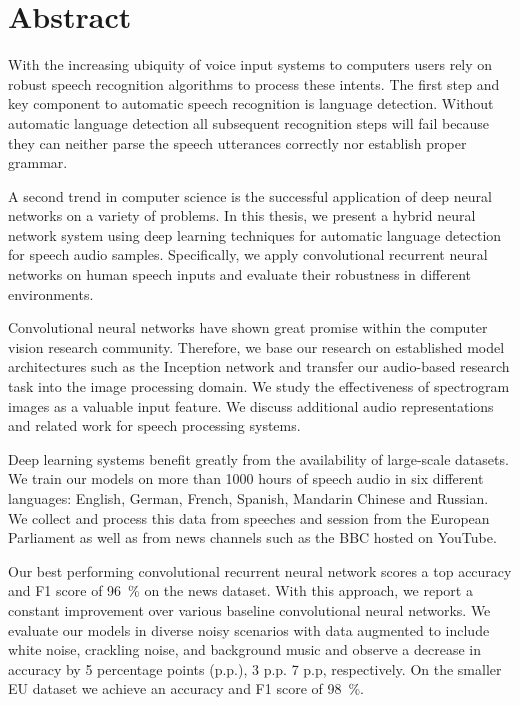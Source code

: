 \section*{\LARGE Abstract}
With the increasing ubiquity of voice input systems to computers users rely on robust speech recognition algorithms to process these intents. The first step and key component to automatic speech recognition is language detection. Without automatic language detection all subsequent recognition steps will fail because they can neither parse the speech utterances correctly nor establish proper grammar.

A second trend in computer science is the successful application of deep neural networks on a variety of problems. In this thesis, we present a hybrid neural network system using deep learning techniques for automatic language detection for speech audio samples. Specifically, we apply convolutional recurrent neural networks on human speech inputs and evaluate their robustness in different environments.

Convolutional neural networks have shown great promise within the computer vision research community. Therefore, we base our research on established model architectures such as the Inception network \cite{szegedy2015going} and transfer our audio-based research task into the image processing domain. We study the effectiveness of spectrogram images as a valuable input feature. We discuss additional audio representations and related work for speech processing systems.

Deep learning systems benefit greatly from the availability of large-scale datasets. We train our models on more than \num{1000} hours of speech audio in six different languages: English, German, French, Spanish, Mandarin Chinese and Russian. We collect and process this data from speeches and session from the European Parliament as well as from news channels such as the BBC hosted on YouTube.

Our best performing convolutional recurrent neural network scores a top accuracy and F1 score of \SI{96}{\percent} on the news dataset. With this approach, we report a constant improvement over various baseline convolutional neural networks. We evaluate our models in diverse noisy scenarios with data augmented to include white noise, crackling noise, and background music and observe a decrease in accuracy by 5 percentage points (p.p.), 3 p.p. 7 p.p, respectively. On the smaller EU dataset we achieve an accuracy and F1 score of \SI{98}{\percent}.